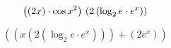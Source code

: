 \documentclass{article}
\begin{document}
\begin{equation}
\left(\left(2x\right) \cdot \cos{x^{2}}\right) \\
\left(2\left(\log_{2}{e} \cdot e^{x}\right)\right)
\end{equation}

\begin{equation}
\left(\left(x\left(2\left(\log_{2}{e} \cdot e^{x}\right)\right)\right) + \left(2e^{x}\right)\right)
\end{equation}
\end{document}
